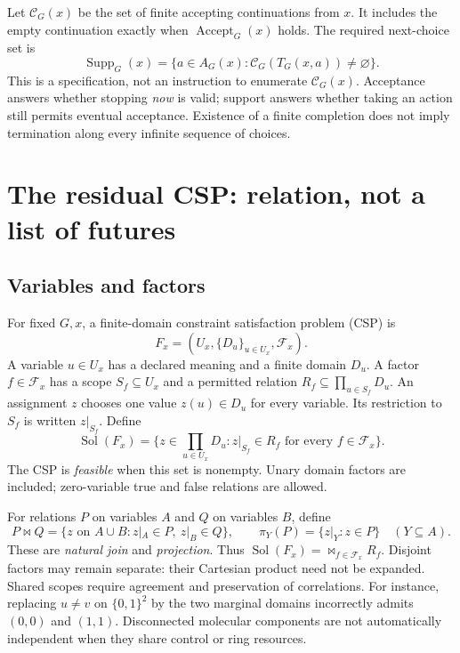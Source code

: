 \documentclass[11pt,a4paper]{article}
\newcommand{\Sol}{\operatorname{Sol}}
\newcommand{\Supp}{\operatorname{Supp}}
\newcommand{\Accept}{\operatorname{Accept}}
\newcommand{\F}{\mathcal F}
\newcommand{\cC}{\mathcal C}
\begin{document}
Let \(\cC_G(x)\) be the set of finite accepting continuations from \(x\). It includes
the empty continuation exactly when \(\Accept_G(x)\) holds. The required next-choice
set is
\begin{equation}\label{eq:support}
 \boxed{\Supp_G(x)=\{a\in A_G(x):\cC_G(T_G(x,a))\ne\varnothing\}.}
\end{equation}
This is a specification, not an instruction to enumerate \(\cC_G(x)\).
Acceptance answers whether stopping \emph{now} is valid; support answers whether
taking an action still permits eventual acceptance. Existence of a finite
completion does not imply termination along every infinite sequence of choices.

\section{The residual CSP: relation, not a list of futures}
\subsection{Variables and factors}
For fixed \(G,x\), a finite-domain constraint satisfaction problem (CSP) is
\[
 F_x=(U_x,\{D_u\}_{u\in U_x},\F_x).
\]
A variable \(u\in U_x\) has a declared meaning and a finite domain \(D_u\). A factor
\(f\in\F_x\) has a scope \(S_f\subseteq U_x\) and a permitted relation
\(R_f\subseteq\prod_{u\in S_f}D_u\). An assignment \(z\) chooses one value
\(z(u)\in D_u\) for every variable. Its restriction to \(S_f\) is written
\(z|_{S_f}\). Define
\begin{equation}\label{eq:solutions}
 \Sol(F_x)=\{z\in\textstyle\prod_{u\in U_x}D_u:
                    z|_{S_f}\in R_f\text{ for every }f\in\F_x\}.
\end{equation}
The CSP is \emph{feasible} when this set is nonempty. Unary domain factors are
included; zero-variable true and false relations are allowed.

For relations \(P\) on variables \(A\) and \(Q\) on variables \(B\), define
\[
 P\Join Q=\{z\text{ on }A\cup B:z|_A\in P,\ z|_B\in Q\},
 \qquad \pi_Y(P)=\{z|_Y:z\in P\}\quad(Y\subseteq A).
\]
These are \emph{natural join} and \emph{projection}. Thus
\(\Sol(F_x)=\Join_{f\in\F_x}R_f\). Disjoint factors may remain separate: their
Cartesian product need not be expanded. Shared scopes require agreement and
preservation of correlations. For instance, replacing \(u\ne v\) on
\(\{0,1\}^2\) by the two marginal domains incorrectly admits \((0,0)\) and
\((1,1)\). Disconnected molecular components are not automatically independent
when they share control or ring resources.\cite{note127}
\end{document}
